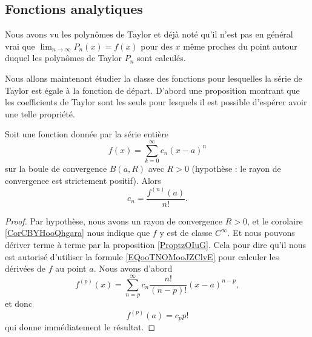 \subsection{Fonctions analytiques}
\label{SUBSECooXKHWooEzqGRJ}

Nous avons vu les polynômes de Taylor et déjà noté qu'il n'est pas en général vrai que \( \lim_{n\to \infty} P_n(x)=f(x)\) pour des \( x\) même proches du point autour duquel les polynômes de Taylor \( P_n\) sont calculés.

Nous allons maintenant étudier la classe des fonctions pour lesquelles la série de Taylor est égale à la fonction de départ. D'abord une proposition montrant que les coefficients de Taylor sont les seuls pour lesquels il est possible d'espérer avoir une telle propriété.
\begin{proposition}      \label{PROPooTRWVooETTtbP}
	Soit une fonction donnée par la série entière
	\begin{equation}
		f(x)=\sum_{k=0}^{\infty}c_n(x-a)^n
	\end{equation}
	sur la boule de convergence \( B(a,R)\) avec \( R>0\) (hypothèse : le rayon de convergence est strictement positif). Alors
	\begin{equation}
		c_n=\frac{ f^{(n)}(a) }{ n! }.
	\end{equation}
\end{proposition}

\begin{proof}
	Par hypothèse, nous avons un rayon de convergence \( R>0\), et le corolaire \ref{CorCBYHooQhgara} nous indique que \( f\) y est de classe \(  C^{\infty}\). Et nous pouvons dériver terme à terme par la proposition \ref{ProptzOIuG}. Cela pour dire qu'il nous est autorisé d'utiliser la formule \eqref{EQooTNOMooJZClvE} pour calculer les dérivées de \( f\) au point \( a\). Nous avons d'abord
	\begin{equation}
		f^{(p)}(x)=\sum_{n=p}^{\infty}c_n\frac{ n! }{ (n-p)! }(x-a)^{n-p},
	\end{equation}
	et donc
	\begin{equation}
		f^{(p)}(a)=c_pp!
	\end{equation}
	qui donne immédiatement le résultat.
\end{proof}

